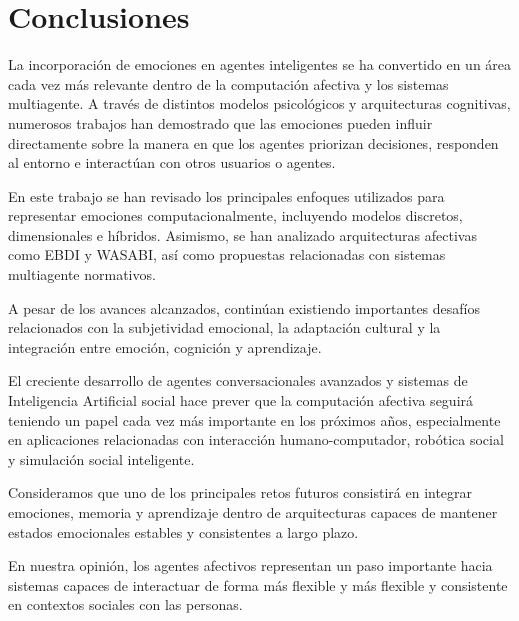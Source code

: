 \section{Conclusiones}

La incorporación de emociones en agentes inteligentes se ha convertido en un área cada vez más relevante dentro de la computación afectiva y los sistemas multiagente. A través de distintos modelos psicológicos y arquitecturas cognitivas, numerosos trabajos han demostrado que las emociones pueden influir directamente sobre la manera en que los agentes priorizan decisiones, responden al entorno e interactúan con otros usuarios o agentes.

En este trabajo se han revisado los principales enfoques utilizados para representar emociones computacionalmente, incluyendo modelos discretos, dimensionales e híbridos. Asimismo, se han analizado arquitecturas afectivas como EBDI y WASABI, así como propuestas relacionadas con sistemas multiagente normativos.

A pesar de los avances alcanzados, continúan existiendo importantes desafíos relacionados con la subjetividad emocional, la adaptación cultural y la integración entre emoción, cognición y aprendizaje.

El creciente desarrollo de agentes conversacionales avanzados y sistemas de Inteligencia Artificial social hace prever que la computación afectiva seguirá teniendo un papel cada vez más importante en los próximos años, especialmente en aplicaciones relacionadas con interacción humano-computador, robótica social y simulación social inteligente.

Consideramos que uno de los principales retos futuros consistirá en integrar emociones, memoria y aprendizaje dentro de arquitecturas capaces de mantener  estados emocionales estables y consistentes a largo plazo.

En nuestra opinión, los agentes afectivos representan un paso importante hacia sistemas capaces de interactuar de forma más flexible y más flexible y consistente en contextos sociales con las personas.